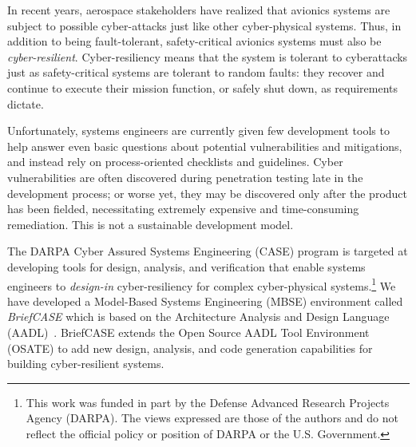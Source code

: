 In recent years, aerospace stakeholders have realized that avionics systems are subject to possible cyber-attacks just like other cyber-physical systems.  Thus, in addition to being fault-tolerant, safety-critical avionics systems must also be {\em cyber-resilient}. Cyber-resiliency means that the system is tolerant to cyberattacks just as safety-critical systems are tolerant to random faults: they recover and continue to execute their mission function, or safely shut down, as requirements dictate. 

Unfortunately, systems engineers are currently given few development tools to help answer even basic questions about potential vulnerabilities and mitigations, and instead rely on process-oriented checklists and guidelines.  Cyber vulnerabilities are often discovered during penetration testing late in the development process; or worse yet, they may be discovered only after the product has been fielded, necessitating extremely expensive and time-consuming remediation. This is not a sustainable development model.

The DARPA Cyber Assured Systems Engineering (CASE) program is targeted at developing tools for design, analysis, and verification that enable systems engineers to {\em design-in} cyber-resiliency for complex cyber-physical systems.\footnote{This work was funded in part by the Defense Advanced Research Projects Agency (DARPA).  The views expressed are those of the authors and do not reflect the official policy or position of DARPA or the U.S. Government.}
We have developed a Model-Based Systems Engineering (MBSE) environment called {\em BriefCASE} which is based on the Architecture Analysis and Design Language (AADL)~\cite{aadl}.  BriefCASE extends the Open Source AADL Tool Environment (OSATE) to add new design, analysis, and code generation capabilities for building cyber-resilient systems.  

